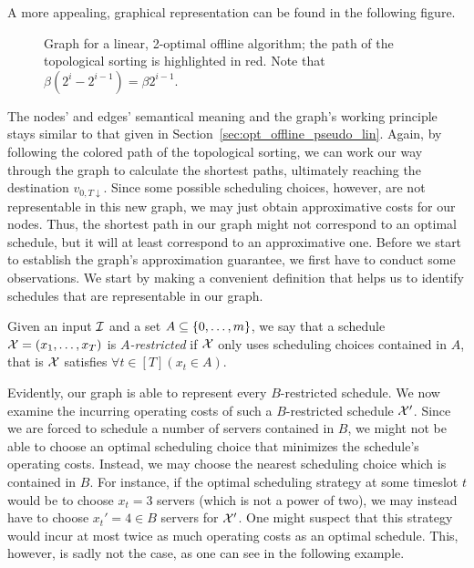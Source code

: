 A more appealing, graphical representation can be found in the following figure.
\begin{figure}[H]

\caption{Graph for a linear, 2-optimal offline algorithm; the path of the topological sorting is highlighted in red. Note that $\beta(2^i-2^{i-1})=\beta2^{i-1}$.}
\label{fig:graph_lin_approx_2}
\end{figure}
The nodes' and edges' semantical meaning and the graph's working principle stays similar to that given in Section~\ref{sec:opt_offline_pseudo_lin}. Again, by following the colored path of the topological sorting, we can work our way through the graph to calculate the shortest paths, ultimately reaching the destination $v_{0,T\downarrow}$. Since some possible scheduling choices, however, are not representable in this new graph, we may just obtain approximative costs for our nodes. Thus, the shortest path in our graph might not correspond to an optimal schedule, but it will at least correspond to an approximative one. Before we start to establish the graph's approximation guarantee, we first have to conduct some observations. We start by making a convenient definition that helps us to identify schedules that are representable in our graph.
\begin{defn}
Given an input $\mathcal{I}$ and a set $A\subseteq\{0,\dotsc,m\}$, we say that a schedule $\mathcal{X}=(x_1,\dotsc,x_T)$ is \emph{$A$-restricted} if $\mathcal{X}$ only uses scheduling choices contained in $A$, that is $\mathcal{X}$ satisfies $\forall t\in[T](x_t\in A)$.
\end{defn}
Evidently, our graph is able to represent every $B$-restricted schedule. We now examine the incurring operating costs of such a $B$-restricted schedule $\mathcal{X}'$. Since we are forced to schedule a number of servers contained in $B$, we might not be able to choose an optimal scheduling choice that minimizes the schedule's operating costs. Instead, we may choose the nearest scheduling choice which is contained in $B$. For instance, if the optimal scheduling strategy at some timeslot $t$ would be to choose $x_t=3$ servers (which is not a power of two), we may instead have to choose $x_t'=4\in B$ servers for $\mathcal{X}'$. One might suspect that this strategy would incur at most twice as much operating costs as an optimal schedule. This, however, is sadly not the case, as one can see in the following example.
